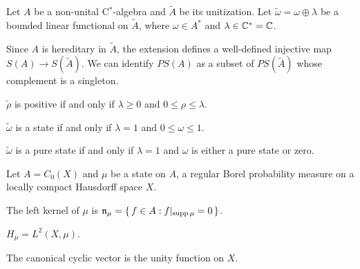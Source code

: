 \documentclass{../../large}
\begin{document}
\begin{prb}
Let $A$ be a non-unital C$^*$-algebra and $\tilde A$ be its unitization.
Let $\tilde\omega=\omega\oplus\lambda$ be a bounded linear functional on $\tilde A$, where $\omega\in A^*$ and $\lambda\in\mathbb{C}^*=\mathbb{C}$.

Since $A$ is hereditary in $\tilde A$, the extension defines a well-defined injective map $S(A)\to S(\tilde A)$.
We can identify $PS(A)$ as a subset of $PS(\tilde A)$ whose complement is a singleton.
\begin{parts}
\item $\tilde\rho$ is positive if and only if $\lambda\ge0$ and $0\le\rho\le\lambda$.
\item $\tilde\omega$ is a state if and only if $\lambda=1$ and $0\le\omega\le1$.
\item $\tilde\omega$ is a pure state if and only if $\lambda=1$ and $\omega$ is either a pure state or zero.
\end{parts}
\end{prb}


\begin{prb}[Representations of $C_0(X)$]
Let $A=C_0(X)$ and $\mu$ be a state on $A$, a regular Borel probability measure on a locally compact Hausdorff space $X$.
\begin{parts}
\item The left kernel of $\mu$ is $\mathfrak{n}_\mu=\{\,f\in A:f|_{\operatorname{supp}\mu}=0\,\}$.
\item $H_\mu=L^2(X,\mu)$.
\item The canonical cyclic vector is the unity function on $X$.
\end{parts}
\end{prb}

\begin{prb}[Representations of $K(H)$]
\end{prb}

\begin{prb}
\end{prb}


\begin{prb}
\end{prb}


\begin{prb}
\end{prb}

\begin{prb}
\end{prb}
\end{document}
